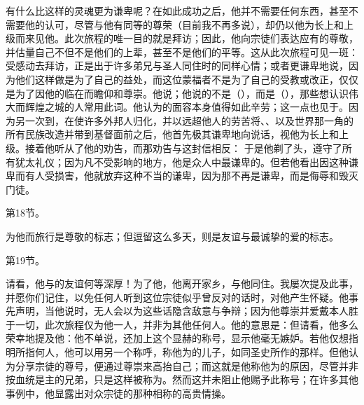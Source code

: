 有什么比这样的灵魂更为谦卑呢？在如此成功之后，他并不需要任何东西，甚至不需要他的认可，尽管与他有同等的尊荣（目前我不再多说），却仍以他为长上和上级而来见他。此次旅程的唯一目的就是拜访；因此，他向宗徒们表达应有的尊敬，并估量自己不但不是他们的上辈，甚至不是他们的平等。这从此次旅程可见一斑：受感动去拜访，正是出于许多弟兄与圣人同住时的同样心情；或者更谦卑地说，因为他们这样做是为了自己的益处，而这位蒙福者不是为了自己的受教或改正，仅仅是为了因他的临在而瞻仰和尊崇。他说；他说的不是（），而是（），那些想认识伟大而辉煌之城的人常用此词。他认为的面容本身值得如此辛劳；这一点也见于。因为另一次到，在使许多外邦人归化，并以远超他人的劳苦将、、以及世界那一角的所有民族改造并带到基督面前之后，他首先极其谦卑地向说话，视他为长上和上级。接着他听从了他的劝告，而那劝告与这封信相反： 于是他剃了头，遵守了所有犹太礼仪；因为凡不受影响的地方，他是众人中最谦卑的。但若他看出因这种谦卑而有人受损害，他就放弃这种不当的谦卑，因为那不再是谦卑，而是侮辱和毁灭门徒。\par

第18节。\par

为他而旅行是尊敬的标志；但逗留这么多天，则是友谊与最诚挚的爱的标志。\par

第19节。\par

请看，他与的友谊何等深厚！为了他，他离开家乡，与他同住。我屡次提及此事，并愿你们记住，以免任何人听到这位宗徒似乎曾反对的话时，对他产生怀疑。他事先声明，当他说时，无人会以为这些话隐含敌意与争辩；因为他尊崇并爱戴本人胜于一切，此次旅程仅为他一人，并非为其他任何人。他的意思是：但请看，他多么荣幸地提及他：他不单说，还加上这个显赫的称号，显示他毫无嫉妒。若他仅想指明所指何人，他可以用另一个称呼，称他为的儿子，如同圣史所作的那样。但他认为分享宗徒的尊号，便通过尊崇来高抬自己；而这就是他称他为的原因，尽管并非按血统是主的兄弟，只是这样被称为。然而这并未阻止他赐予此称号；在许多其他事例中，他显露出对众宗徒的那种相称的高贵情操。\par


